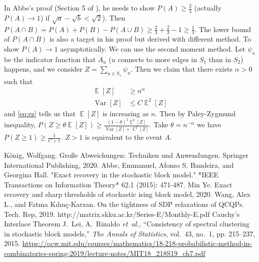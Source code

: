 \documentclass{article}
\DeclareMathOperator{\Var}{Var}
\DeclareMathOperator{\E}{\mathbb{E}}
\begin{document}
In Abbe's proof (Section 5 of \cite{abbe}), he needs to show
$P(A) \geq \frac{2}{3}$ (actually $P(A)\to 1$)
if $\sqrt{a} - \sqrt{b} < \sqrt{2}$).
Then $P(A\cap B) = P(A)
+ P(B) - P(A\cup B) \geq \frac{2}{3}
+ \frac{2}{3} - 1 \geq \frac{1}{3}
$. The lower bound of $P(A\cap B)$ is
also a target in his proof but derived
with different method.
To show $P(A) \to 1$ asymptotically.
We can use the second moment method.
Let $\psi_u$ be the indicator function
that $A_u$ ($u$ connects to more edges
in $S_1$ than in $S_2$) happens, and we consider
$Z=\sum_{u \in S_1} \psi_u$.
Then we claim that there exists $\alpha >
0$ such that
\begin{align}\label{eq:ez}
	\E[Z] &\geq n^{\alpha} \\
	\Var[Z] &\leq C\E^2[Z]
\end{align}
and
\eqref{eq:ez} tells us that
$\E[Z]$ is increasing as $n$. Then
by Paley-Zygmund inequality,
$P(Z \geq \theta \E[Z])
\geq \frac{(1-\theta)^2\E^2[Z]}{\Var[Z]
+ \E^2[Z]}$.
Take $\theta = n^{-\alpha}$ we have
$P(Z \geq 1) \geq \frac{1}{C + 1}$.
$Z>1$ is equivalent
to the event $A$.
\begin{thebibliography}{9}
	 König, Wolfgang. Große Abweichungen: Techniken und Anwendungen. Springer International Publishing, 2020.
	 Abbe, Emmanuel, Afonso S. Bandeira, and Georgina Hall. "Exact recovery in the stochastic block model." *IEEE Transactions on Information Theory* 62.1 (2015): 471-487.
	 	Min Ye.
	\newblock Exact recovery and sharp thresholds of stochastic ising block model,
	2020.
	 Wang, Alex L., and Fatma Kılınç-Karzan. On the tightness of SDP relaxations of QCQPs. Tech. Rep, 2019.
	 http://matrix.skku.ac.kr/Series-E/Monthly-E.pdf Cauchy’s Interlace Theorem
	J.~Lei, A.~Rinaldo \emph{et~al.}, ``Consistency of spectral clustering in
	stochastic block models,'' \emph{The Annals of Statistics}, vol.~43, no.~1,
	pp. 215--237, 2015.
	 \url{https://ocw.mit.edu/courses/mathematics/18-218-probabilistic-method-in-combinatorics-spring-2019/lecture-notes/MIT18_218S19_ch7.pdf}
\end{thebibliography}
\end{document}
